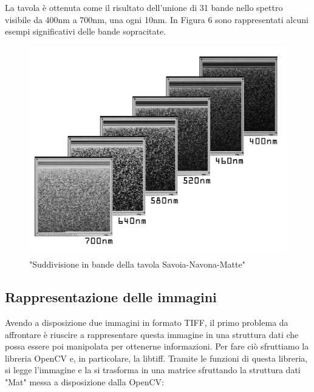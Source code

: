 \documentclass[a4paper,11pt]{article}
\begin{document}
    La tavola è ottenuta come il risultato dell'unione di 31 bande nello spettro visibile da 400nm a 700nm, una ogni 10nm.
    In Figura 6 sono rappresentati alcuni esempi significativi delle bande sopracitate.
    \begin{figure}[h]
        \centering
        \includegraphics[scale=0.15]{tavola2}
        \caption{"Suddivisione in bande della tavola Savoia-Navona-Matte"}
    \end{figure}


    \newpage
    \subsection{Rappresentazione delle immagini}
    Avendo a disposizione due immagini in formato TIFF, il primo problema da affrontare è riuscire a rappresentare questa immagine in una struttura dati che possa essere poi manipolata per ottenerne informazioni.
    Per fare ciò sfruttiamo la libreria OpenCV e, in particolare, la libtiff. Tramite le funzioni di questa libreria, si legge l'immagine e la si trasforma in una matrice sfruttando la struttura dati "Mat" messa a disposizione dalla OpenCV:
 
\end{document}
